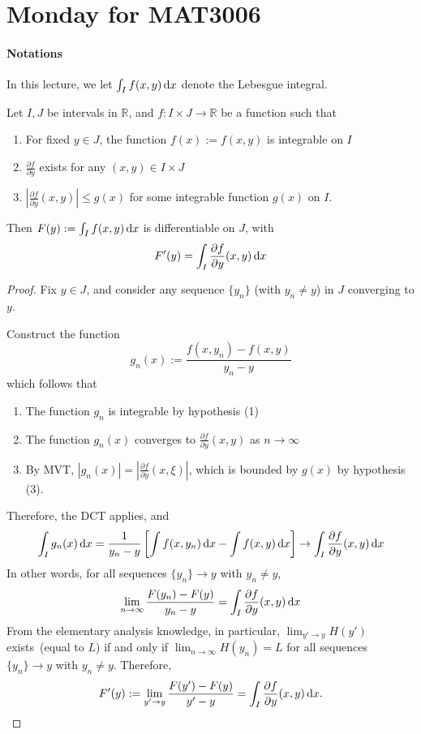 
\section{Monday for MAT3006}

\paragraph{Notations}
In this lecture, we let $\int_If(x,y)\,\mathrm{d} x$ denote the Lebesgue integral.

\begin{theorem}
Let $I,J$ be intervals in $\mathbb{R}$, and $f:I\times J\to\mathbb{R}$ be a function such that
\begin{enumerate}
\item
For fixed $y\in J$, the function $f(x):=f(x,y)$ is integrable on $I$
\item
$\frac{\partial f}{\partial y}$ exists for any $(x,y)\in I\times J$
\item
$\left|\frac{\partial f}{\partial y}(x,y)\right|\le g(x)$ for some integrable function $g(x)$ on $I$.
\end{enumerate}
Then $F(y):=\int_If(x,y)\,\mathrm{d} x$ is differentiable on $J$, with
\[
F'(y)=\int_I\frac{\partial f}{\partial y}(x,y)\,\mathrm{d} x
\]
\end{theorem}
\begin{proof}
Fix $y\in J$, and consider any sequence $\{y_n\}$ (with $y_n\ne y$) in $J$ converging to $y$.

Construct the function
\[
g_n(x):=\frac{f(x,y_n) - f(x,y)}{y_n-y}
\]
which follows that 
\begin{enumerate}
\item
The function $g_n$ is integrable by hypothesis (1)
\item
The function $g_n(x)$ converges to $\frac{\partial f}{\partial y}(x,y)$ as $n\to\infty$
\item
By MVT, $|g_n(x)|=|\frac{\partial f}{\partial y}(x,\xi)|$, which is bounded by $g(x)$ by hypothesis (3).
\end{enumerate}
Therefore, the DCT applies, and 
\[
\int_Ig_n(x)\,\mathrm{d} x
=
\frac{1}{y_n-y}\left[\int f(x,y_n)\,\mathrm{d} x - \int f(x,y)\,\mathrm{d} x\right]
\to\int_I\frac{\partial f}{\partial y}(x,y)\,\mathrm{d} x
\]
In other words, for all sequences $\{y_n\}\to y$ with $y_n\ne y$,
\[
\lim_{n\to\infty}\frac{F(y_n) - F(y)}{y_n-y}=\int_I\frac{\partial f}{\partial y}(x,y)\,\mathrm{d} x
\]
From the elementary analysis knowledge, in particular, $\lim_{y'\to y}H(y')$ exists~(equal to $L$) if and only if 
$\lim_{n\to\infty}H(y_n)=L$
for all sequences $\{y_n\}\to y$ with $y_n\ne y$.
Therefore,
\[
F'(y):=\lim_{y'\to y}\frac{F(y')-F(y)}{y'-y}=\int_I\frac{\partial f}{\partial y}(x,y)\,\mathrm{d} x.
\]
\end{proof}

